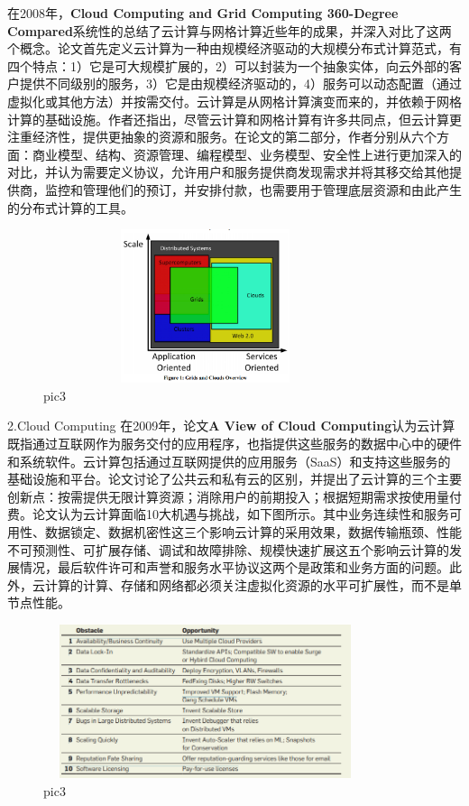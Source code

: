 \documentclass[a4paper,twoside]{scrbook}
\begin{document}
在2008年，\textbf{Cloud Computing and Grid Computing 360-Degree Compared}系统性的总结了云计算与网格计算近些年的成果，并深入对比了这两个概念。论文首先定义云计算为一种由规模经济驱动的大规模分布式计算范式，有四个特点：1）它是可大规模扩展的，2）可以封装为一个抽象实体，向云外部的客户提供不同级别的服务，3）它是由规模经济驱动的，4）服务可以动态配置（通过虚拟化或其他方法）并按需交付。云计算是从网格计算演变而来的，并依赖于网格计算的基础设施。作者还指出，尽管云计算和网格计算有许多共同点，但云计算更注重经济性，提供更抽象的资源和服务。在论文的第二部分，作者分别从六个方面：商业模型、结构、资源管理、编程模型、业务模型、安全性上进行更加深入的对比，并认为需要定义协议，允许用户和服务提供商发现需求并将其移交给其他提供商，监控和管理他们的预订，并安排付款，也需要用于管理底层资源和由此产生的分布式计算的工具。
\begin{figure}
\centering %
\includegraphics[height=4.5cm,width=9.5cm]{compared.png}
\caption{pic3}
\end{figure}


2.Cloud Computing
在2009年，论文\textbf{A View of Cloud Computing}认为云计算既指通过互联网作为服务交付的应用程序，也指提供这些服务的数据中心中的硬件和系统软件。云计算包括通过互联网提供的应用服务（SaaS）和支持这些服务的基础设施和平台。论文讨论了公共云和私有云的区别，并提出了云计算的三个主要创新点：按需提供无限计算资源；消除用户的前期投入；根据短期需求按使用量付费。论文认为云计算面临10大机遇与挑战，如下图所示。其中业务连续性和服务可用性、数据锁定、数据机密性这三个影响云计算的采用效果，数据传输瓶颈、性能不可预测性、可扩展存储、调试和故障排除、规模快速扩展这五个影响云计算的发展情况，最后软件许可和声誉和服务水平协议这两个是政策和业务方面的问题。此外，云计算的计算、存储和网络都必须关注虚拟化资源的水平可扩展性，而不是单节点性能。
\begin{figure}
\centering %
\includegraphics[height=4.5cm,width=9.5cm]{cloud10.png}
\caption{pic3}
\end{figure}
\end{document}
